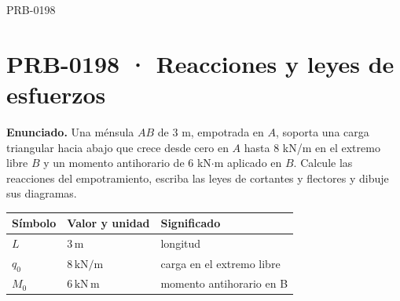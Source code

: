 \begin{studiumworked}{PRB-0198}

\section{PRB-0198 · Reacciones y leyes de esfuerzos}

\textbf{Enunciado.} Una ménsula $AB$ de 3 m, empotrada en $A$, soporta una carga triangular hacia abajo que crece desde cero en $A$ hasta 8 kN/m en el extremo libre $B$ y un momento antihorario de 6 kN$\cdot$m aplicado en $B$. Calcule las reacciones del empotramiento, escriba las leyes de cortantes y flectores y dibuje sus diagramas.

\par\medskip\noindent\begin{tabular}{@{}p{.18\linewidth}p{.26\linewidth}p{.48\linewidth}@{}}
\toprule Símbolo & Valor y unidad & Significado\\\midrule
$L$ & $3\,\mathrm{m}$ & longitud\\
$q_{0}$ & $8\,\mathrm{kN/m}$ & carga en el extremo libre\\
$M_{0}$ & $6\,\mathrm{kN\,m}$ & momento antihorario en B\\
\bottomrule\end{tabular}\par\medskip


\end{studiumworked}
